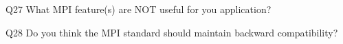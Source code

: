 \begin{description}%
\item{Q27} What MPI feature(s) are NOT useful for you application?%
\item{Q28} Do you think the MPI standard should maintain backward compatibility?%
\end{description}%

